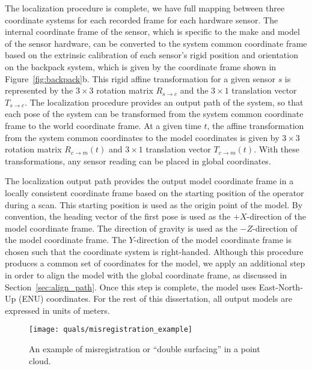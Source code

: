 \documentclass[12pt,onecolumn,oneside]{book}
\begin{document}
The localization procedure is complete, we have full mapping between three coordinate systems for each recorded frame for each hardware sensor.  The internal coordinate frame of the sensor, which is specific to the make and model of the sensor hardware, can be converted to the system common coordinate frame based on the extrinsic calibration of each sensor's rigid position and orientation on the backpack system, which is given by the coordinate frame shown in Figure~\ref{fig:backpack}b.  This rigid affine transformation for a given sensor $s$ is represented by the $3 \times 3$ rotation matrix $R_{s\rightarrow c}$ and the $3 \times 1$ translation vector $T_{s\rightarrow c}$.  The localization procedure provides an output path of the system, so that each pose of the system can be transformed from the system common coordinate frame to the world coordinate frame.  At a given time $t$, the affine transformation from the system common coordinates to the model coordinates is given by $3 \times 3$ rotation matrix $R_{c\rightarrow m}(t)$ and $3 \times 1$ translation vector $T_{c\rightarrow m}(t)$.  With these transformations, any sensor reading can be placed in global coordinates.

The localization output path provides the output model coordinate frame in a locally consistent coordinate frame based on the starting position of the operator during a scan.  This starting position is used as the origin point of the model.  By convention, the heading vector of the first pose is used as the $+X$-direction of the model coordinate frame.  The direction of gravity is used as the $-Z$-direction of the model coordinate frame.  The $Y$-direction of the model coordinate frame is chosen such that the coordinate system is right-handed.  Although this procedure produces a common set of coordinates for the model, we apply an additional step in order to align the model with the global coordinate frame, as discussed in Section~\ref{sec:align_path}.  Once this step is complete, the model uses East-North-Up (ENU) coordinates.  For the rest of this dissertation, all output models are expressed in units of meters.

\begin{figure}
	\centerline{\texttt{[image: quals/misregistration\_example]}}
	\caption{An example of misregistration or ``double surfacing'' in a point cloud.}
	\label{fig:double_surface}
\end{figure}
\end{document}

